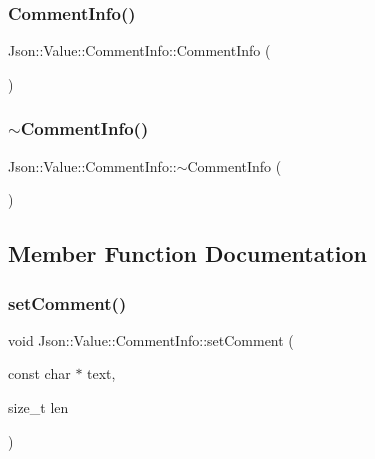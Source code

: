 \subsubsection{\texorpdfstring{Comment\+Info()}{CommentInfo()}\hspace{0.1cm}{\footnotesize\ttfamily [2/2]}}
{\footnotesize\ttfamily Json\+::\+Value\+::\+Comment\+Info\+::\+Comment\+Info (\begin{DoxyParamCaption}{ }\end{DoxyParamCaption})}

\hypertarget{struct_json_1_1_value_1_1_comment_info_ab4d0877190bdbf484e4e2a3bade42ac8}{}\label{struct_json_1_1_value_1_1_comment_info_ab4d0877190bdbf484e4e2a3bade42ac8} 
\subsubsection{\texorpdfstring{$\sim$\+Comment\+Info()}{~CommentInfo()}\hspace{0.1cm}{\footnotesize\ttfamily [2/2]}}
{\footnotesize\ttfamily Json\+::\+Value\+::\+Comment\+Info\+::$\sim$\+Comment\+Info (\begin{DoxyParamCaption}{ }\end{DoxyParamCaption})}



\subsection{Member Function Documentation}
\hypertarget{struct_json_1_1_value_1_1_comment_info_a4d01c2cd8c07995969c5d636dfd4fa8c}{}\label{struct_json_1_1_value_1_1_comment_info_a4d01c2cd8c07995969c5d636dfd4fa8c} 
\subsubsection{\texorpdfstring{set\+Comment()}{setComment()}\hspace{0.1cm}{\footnotesize\ttfamily [1/2]}}
{\footnotesize\ttfamily void Json\+::\+Value\+::\+Comment\+Info\+::set\+Comment (\begin{DoxyParamCaption}\item[{const char $\ast$}]{text,  }\item[{size\+\_\+t}]{len }\end{DoxyParamCaption})}

